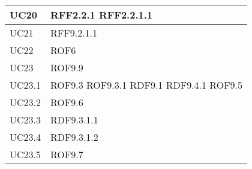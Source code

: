 \documentclass[../AnalisideiRequisiti.tex]{subfiles}
\begin{document}
\begin{longtable}{| p{4cm} | p{4cm} |}
		\hline
		\newline UC20 &  \newline RFF2.2.1 \newline RFF2.2.1.1\\[1em]
		\hline
		\newline UC21 &  \newline RFF9.2.1.1 \\[1em]
		\hline
		\newline UC22 &  \newline ROF6 \\[1em]
		\hline			
		\newline UC23 &  \newline ROF9.9 \\[1em]
		\hline			
		\newline UC23.1 &  \newline ROF9.3 \newline ROF9.3.1 \newline RDF9.1 \newline RDF9.4.1 \newline ROF9.5 \\[1em]
		\hline
		\newline UC23.2 &  \newline ROF9.6 \\[1em]
		\hline
		\newline UC23.3 &   \newline RDF9.3.1.1 \\[1em]
		\hline
		\newline UC23.4 &  \newline RDF9.3.1.2 \\[1em]
		\hline
		\newline UC23.5 &  \newline ROF9.7 \\[1em]
		\hline
	\end{longtable}
\newpage
\end{document}
